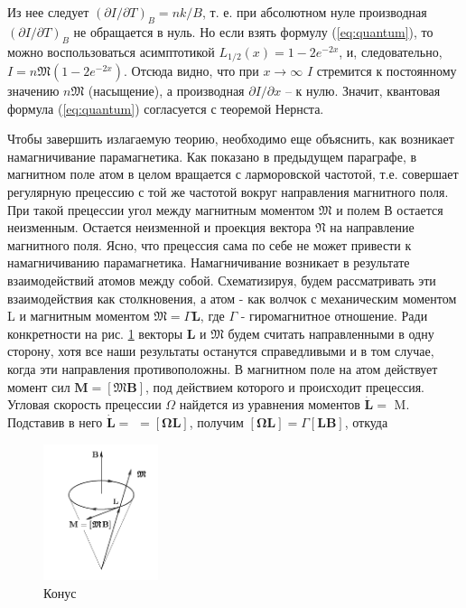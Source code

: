 \documentclass[12pt]{article}
\begin{document}
  Из нее следует $(\partial I / \partial T)_B=n k / B$, т. е. при абсолютном нуле производная $(\partial I / \partial T)_B$ не обращается в нуль. Но если взять формулу (\ref{eq:quantum}), то можно воспользоваться асимптотикой $L_{1 / 2}(x)=1-2 e^{-2 x}$, и, следовательно, $I=n \mathfrak{M}\left(1-2 e^{-2 x}\right)$. Отсюда видно, что при $x \rightarrow \infty$ $I$ стремится к постоянному значению $n\mathfrak{M}$ (насыщение), а производная $\partial I / \partial x$ -- к нулю. Значит, квантовая формула (\ref{eq:quantum}) согласуется с теоремой Нернста.

  Чтобы завершить излагаемую теорию, необходимо еще объяснить, как возникает намагничивание парамагнетика. Как показано в предыдущем параграфе, в магнитном поле атом в целом вращается с ларморовской частотой, т.е. совершает регулярную прецессию с той же частотой вокруг направления магнитного поля. При такой прецессии угол между магнитным моментом $\mathfrak{M}$ и полем В остается неизменным. Остается неизменной и проекция вектора $\mathfrak{N}$ на направление магнитного поля. Ясно, что прецессия сама по себе не может привести к намагничиванию парамагнетика. Намагничивание возникает в результате взаимодействий атомов между собой. Схематизируя, будем рассматривать эти взаимодействия как столкновения, а атом - как волчок с механическим моментом L и магнитным моментом $\mathfrak{M}=\Gamma \mathbf{L}$, где $\Gamma$ - гиромагнитное отношение. Ради конкретности на рис. \ref{fig:176} векторы $\mathbf{L}$ и $\mathfrak{M}$ будем считать направленными в одну сторону, хотя все наши результаты останутся справедливыми и в том случае, когда эти направления противоположны. В магнитном поле на атом действует момент сил $\mathbf{M}=[\mathfrak{M} \mathbf{B}]$, под действием которого и происходит прецессия. Угловая скорость прецессии $\Omega$ найдется из уравнения моментов $\dot{\mathbf{L}}=$ M. Подставив в него $\dot{\mathbf{L}}=$ $=[\boldsymbol{\Omega L}]$, получим $[\boldsymbol{\Omega L}]=\Gamma[\mathbf{L B}]$, откуда

  \begin{figure}
    \centering
    \includegraphics[width=0.3\textwidth]{conus.png}
    \caption{Конус}
    \label{fig:176}
  \end{figure}
\end{document}
